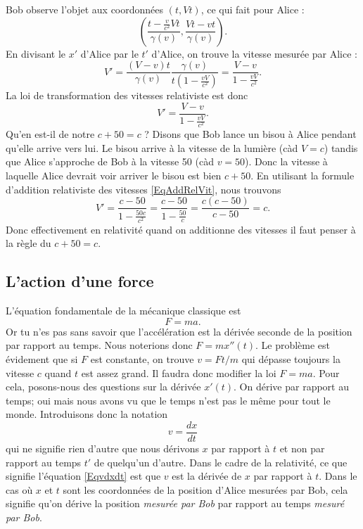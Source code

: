 Bob observe l'objet aux coordonnées $(t,Vt)$, ce qui fait pour Alice :
\[ 
  \left( \frac{ t-\frac{ v }{ c^2 }Vt }{ \gamma(v) },\frac{ Vt-vt }{ \gamma(v) } \right).
\]
En divisant le $x'$ d'Alice par le $t'$ d'Alice, on trouve la vitesse mesurée par Alice :
\[ 
  V'=\frac{ (V-v)t }{ \gamma(v) }\frac{ \gamma(v) }{ t\left( 1-\frac{ vV }{ c^2 } \right) }=\frac{ V-v }{ 1-\frac{ vV }{ c^2 } }.
\]
La loi de transformation des vitesses relativiste est donc
\begin{equation}	\label{EqAddRelVit}
V'=\frac{ V-v }{ 1-\frac{ vV }{ c^2 } }.
\end{equation}
Qu'en est-il de notre $c+50=c$ ? Disons que Bob lance un bisou à Alice pendant qu'elle arrive vers lui. Le bisou arrive à la vitesse de la lumière (càd $V=c$) tandis que Alice s'approche de Bob à la vitesse \unit{50}{\meter\per\second} (càd $v=50$). Donc la vitesse à laquelle Alice devrait voir arriver le bisou est bien $c+50$. En utilisant la formule d'addition relativiste des vitesses \eqref{EqAddRelVit}, nous trouvons
\[ 
  V'=\frac{ c-50 }{ 1-\frac{ 50c }{ c^2 } }=\frac{ c-50 }{ 1-\frac{ 50 }{ c } }=\frac{ c(c-50) }{ c-50 }=c.
\]
Donc effectivement en relativité quand on additionne des vitesses il faut penser à la règle du \og $c+50=c$\fg.

\subsection{L'action d'une force}

L'équation fondamentale de la mécanique classique est 
\[ 
  F=ma.
\]
Or tu n'es pas sans savoir que l'accélération est la dérivée seconde de la position par rapport au temps. Nous noterions donc $F=mx''(t)$. Le problème est évidement que si $F$ est constante, on trouve $v=Ft/m$ qui dépasse toujours la vitesse $c$ quand $t$ est assez grand. Il faudra donc modifier la loi $F=ma$. Pour cela, posons-nous des questions sur la dérivée $x'(t)$. On dérive par rapport au temps; oui mais nous avons vu que le temps n'est pas le même pour tout le monde. Introduisons donc la notation
\begin{equation}	\label{Eqvdxdt}
  v=\frac{ dx }{ dt }
\end{equation}
qui ne signifie rien d'autre que nous dérivons $x$ par rapport à $t$ et non par rapport au temps $t'$ de quelqu'un d'autre. Dans le cadre de la relativité, ce que signifie l'équation \eqref{Eqvdxdt} est que $v$ est la dérivée de $x$ par rapport à $t$. Dans le cas où $x$ et $t$ sont les coordonnées de la position d'Alice mesurées par Bob, cela signifie qu'on dérive la position \emph{mesurée par Bob} par rapport au temps \emph{mesuré par Bob}.

